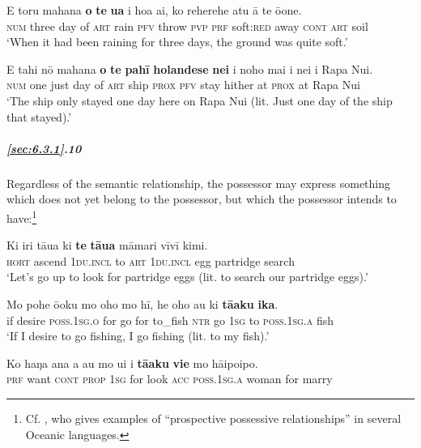 \ea\label{ex:6.49}
\gll E toru mahana \textbf{o} \textbf{te} \textbf{{\ꞌ}ua} i hoa ai, ko reherehe atu {\ꞌ}ā te {\ꞌ}ō{\ꞌ}one. \\
\textsc{num} three day of \textsc{art} rain \textsc{pfv} throw \textsc{pvp} \textsc{prf} soft:\textsc{red} away \textsc{cont} \textsc{art} soil \\

\glt 
‘When it had been raining for three days, the ground was quite soft.’ \textstyleExampleref{[R378.040]} 
\z

\ea\label{ex:6.50}
\gll E tahi nō mahana \textbf{o} \textbf{te} \textbf{pahī} \textbf{holandese} \textbf{nei} i noho mai {\ꞌ}i nei  {\ꞌ}i Rapa Nui.\\
\textsc{num} one just day of \textsc{art} ship  \textsc{prox} \textsc{pfv} stay hither at \textsc{prox}  at Rapa Nui\\

\glt
‘The  ship only stayed one day here on Rapa Nui (lit. Just one day of the  ship that stayed).’ \textstyleExampleref{[R373.005]} 
\z

\subparagraph{\ref{sec:6.3.1}.10} Regardless of the semantic relationship, the possessor may express something which does not yet belong to the possessor, but which the possessor intends to have:\footnote{\label{fn:291}Cf. \citet{Lichtenberk2002}, who gives examples of “prospective possessive relationships” in several Oceanic languages.}

\ea\label{ex:6.51}
\gll Ki iri tāua ki \textbf{te} \textbf{tāua} māmari vīvī kimi. \\
\textsc{hort} ascend \textsc{1du.incl} to \textsc{art} \textsc{1du.incl} egg partridge search \\

\glt 
‘Let’s go up to look for partridge eggs (lit. to search our partridge eggs).’ \textstyleExampleref{[R245.192]} 
\z

\ea\label{ex:6.52}
\gll Mo pohe ō{\ꞌ}oku mo oho mo hī, he oho au ki \textbf{tā{\ꞌ}aku} \textbf{ika}. \\
if desire \textsc{poss.1sg.o} for go for to\_fish \textsc{ntr} go \textsc{1sg} to \textsc{poss.1sg.a} fish \\

\glt 
‘If I desire to go fishing, I go fishing (lit. to my fish).’ \textstyleExampleref{[R647.061]} 
\z

\ea\label{ex:6.53}
\gll Ko haŋa {\ꞌ}ana a au mo u{\ꞌ}i i \textbf{tā{\ꞌ}aku} \textbf{vi{\ꞌ}e} mo hāipoipo. \\
\textsc{prf} want \textsc{cont} \textsc{prop} \textsc{1sg} for look \textsc{acc} \textsc{poss.1sg.a} woman for marry \\

